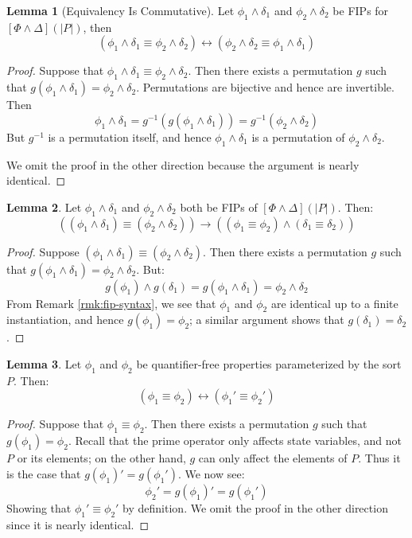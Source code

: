 \documentclass[12pt]{article}
\theoremstyle{definition}
\newtheorem{lemma}{Lemma}
\theoremstyle{remark}
\begin{document}
\begin{lemma}[Equivalency Is Commutative]
  \label{lem:fip-eq-comm}
  Let $\phi_1\land\delta_1$ and $\phi_2\land\delta_2$ be FIPs for $[\Phi\land\Delta](|P|)$, then
  $$(\phi_1\land\delta_1 \equiv \phi_2\land\delta_2) \leftrightarrow (\phi_2\land\delta_2 \equiv \phi_1\land\delta_1)$$
\end{lemma}
\begin{proof}
  Suppose that $\phi_1\land\delta_1 \equiv \phi_2\land\delta_2$.  Then there exists a permutation $g$ such that $g(\phi_1\land\delta_1) = \phi_2\land\delta_2$.  Permutations are bijective and hence are invertible.  Then
  $$\phi_1\land\delta_1 = g^{-1}(g(\phi_1\land\delta_1)) = g^{-1}(\phi_2\land\delta_2)$$
  But $g^{-1}$ is a permutation itself, and hence $\phi_1\land\delta_1$ is a permutation of $\phi_2\land\delta_2$.

  We omit the proof in the other direction because the argument is nearly identical.
\end{proof}

\begin{lemma}
  \label{lem:and-decomp}
  Let $\phi_1\land\delta_1$ and $\phi_2\land\delta_2$ both be FIPs of $[\Phi\land\Delta](|P|)$.  Then:
  $$((\phi_1\land\delta_1) \equiv (\phi_2\land\delta_2)) \rightarrow ((\phi_1 \equiv \phi_2) \land (\delta_1 \equiv \delta_2))$$
\end{lemma}
\begin{proof}
  Suppose $(\phi_1\land\delta_1) \equiv (\phi_2\land\delta_2)$.  Then there exists a permutation $g$ such that $g(\phi_1\land\delta_1) = \phi_2\land\delta_2$.  But:
  $$g(\phi_1) \land g(\delta_1) = g(\phi_1\land\delta_1) = \phi_2\land\delta_2$$
  From Remark \ref{rmk:fip-syntax}, we see that $\phi_1$ and $\phi_2$ are identical up to a finite instantiation, and hence $g(\phi_1) = \phi_2$; a similar argument shows that $g(\delta_1) = \delta_2$.
\end{proof}

\begin{lemma}
  \label{lem:prime-bijec}
  Let $\phi_1$ and $\phi_2$ be quantifier-free properties parameterized by the sort $P$.  Then:
  $$(\phi_1 \equiv \phi_2) \leftrightarrow (\phi_1' \equiv \phi_2')$$
\end{lemma}
\begin{proof}
  Suppose that $\phi_1 \equiv \phi_2$.  Then there exists a permutation $g$ such that $g(\phi_1) = \phi_2$.  Recall that the prime operator only affects state variables, and not $P$ or its elements; on the other hand, $g$ can only affect the elements of $P$.  Thus it is the case that $g(\phi_1)' = g(\phi_1')$.  We now see:
  $$\phi_2' = g(\phi_1)' = g(\phi_1')$$
  Showing that $\phi_1' \equiv \phi_2'$ by definition.  We omit the proof in the other direction since it is nearly identical.
\end{proof}
\end{document}
